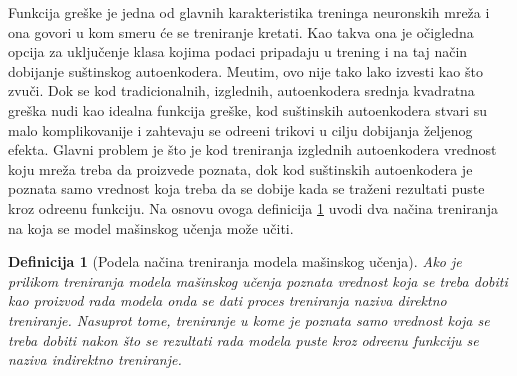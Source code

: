 \documentclass{article}
\newtheorem{definition}{Definicija}
\begin{document}
	Funkcija gre\v ske je jedna od glavnih karakteristika treninga neuronskih mre\v za i ona govori u kom smeru \'ce se treniranje kretati. 
	Kao takva ona je o\v cigledna opcija za uklju\v cenje klasa kojima podaci pripadaju u trening i na taj na\v cin dobijanje su\v stinskog autoenkodera. 
	Me\dj utim, ovo nije tako lako izvesti kao \v sto zvu\v ci. 
	Dok se kod tradicionalnih, izglednih, autoenkodera srednja kvadratna gre\v ska nudi kao idealna funkcija gre\v ske, kod su\v stinskih autoenkodera stvari su malo komplikovanije i zahtevaju se odre\dj eni trikovi u cilju dobijanja \v zeljenog efekta.
	Glavni problem je \v sto je kod treniranja izglednih autoenkodera vrednost koju mre\v za treba da proizvede poznata, dok kod su\v stinskih autoenkodera je poznata samo vrednost koja treba da se dobije kada se tra\v zeni rezultati puste kroz odre\dj enu funkciju.
	Na osnovu ovoga definicija \ref{types-of-machine-learning-training} uvodi dva na\v cina treniranja na koja se model ma\v sinskog u\v cenja mo\v ze u\v citi.
	
	\begin{definition}[Podela na\v cina treniranja modela ma\v sinskog u\v cenja]
		\label{types-of-machine-learning-training}
		Ako je prilikom treniranja modela ma\v sinskog u\v cenja poznata vrednost koja se treba dobiti kao proizvod rada modela onda se dati proces treniranja naziva \emph{direktno treniranje}. 
		Nasuprot tome, treniranje u kome je poznata samo vrednost koja se treba dobiti nakon \v sto se rezultati rada modela puste kroz odre\dj enu funkciju se naziva \emph{indirektno treniranje}.
	\end{definition}
\end{document}
